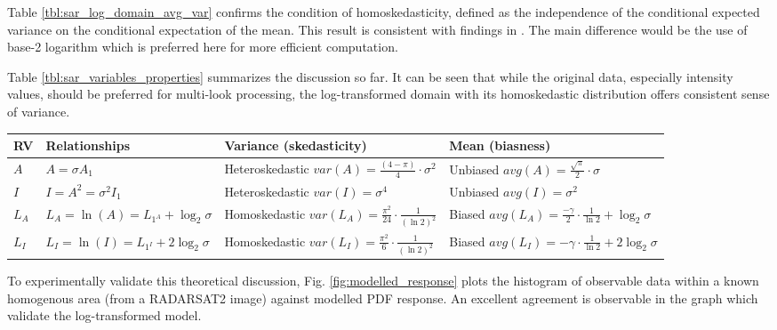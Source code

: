 Table \ref{tbl:sar_log_domain_avg_var} confirms the condition of homoskedasticity,  
defined as the independence of the conditional expected variance on the conditional expectation of the mean. 
This result is consistent with findings in \cite{Arsenault_JOptSocAm_1976}. 
The main difference would be the use of base-2 logarithm which is preferred here for more efficient computation. 

Table \ref{tbl:sar_variables_properties} summarizes the discussion so far. 
It can be seen that while the original data, especially intensity values, should be preferred for 
multi-look processing, the log-transformed domain with its homoskedastic distribution offers consistent sense of variance. 

\begin{table*}[t]
\scriptsize
\centering

\begin{tabular}{|l|l|l|l|}
\hline
 RV & Relationships  & Variance (skedasticity) & Mean (biasness) \\
\hline
$A$ 
	& $A=\sigma A_1 $ 
	& Heteroskedastic $var(A) = \frac{(4-\pi)}{4} \cdot \sigma^2 $ 
	& Unbiased $avg(A) = \frac{\sqrt{\pi}}{2} \cdot \sigma $ \\
$I$ 
	& $I=A^2=\sigma^2 I_1 $ 
	& Heteroskedastic $ var(I) = \sigma^4$ 
	& Unbiased $avg(I) = \sigma^2 $\\
$L_A$ 
	& $L_A=\ln(A)=L_{1^A} + \log_2{\sigma}$ 
	& Homoskedastic $var(L_A) = \frac{ \pi ^2}{24} \cdot \frac{1}{(\ln2)^2}$ 
	& Biased $avg(L_A) = \frac{ - \gamma }{2} \cdot \frac{1}{\ln2} + \log_2{\sigma}$ \\
$L_I$ 
	& $L_I=\ln(I)=L_{1^I} + 2 \log_2{\sigma}$  
	& Homoskedastic $var(L_I) = \frac{ \pi ^2}{6} \cdot \frac{1}{(\ln2)^2}$ 
	& Biased $avg(L_I) = - \gamma \cdot \frac{1}{\ln2} + 2 \log_2{\sigma}  $ \\
\hline
\end{tabular}

\caption{ The properties of observable SAR random variables }
\label{tbl:sar_variables_properties}

\end{table*}

To experimentally validate this theoretical discussion, Fig. \ref{fig:modelled_response} plots the histogram of observable data within a 
known homogenous area (from a RADARSAT2 image) against modelled PDF response. 
An excellent agreement is observable in the graph which validate the log-transformed model. 

